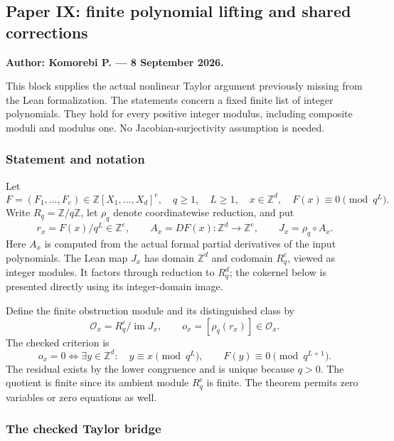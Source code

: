 \hypertarget{cont1:paper-ix-finite-polynomial-lifting-and-shared-corrections}{%
\subsection{Paper IX: finite polynomial lifting and shared
corrections}\label{cont1:paper-ix-finite-polynomial-lifting-and-shared-corrections}}

\textbf{Author: Komorebi P. --- 8 September 2026.}

This block supplies the actual nonlinear Taylor argument previously
missing from the Lean formalization. The statements concern a fixed
finite list of integer polynomials. They hold for every positive integer
modulus, including composite moduli and modulus one. No
Jacobian-surjectivity assumption is needed.

\hypertarget{cont1:statement-and-notation}{%
\subsubsection{Statement and notation}\label{cont1:statement-and-notation}}

Let \[
F=(F_1,\ldots,F_e)\in\mathbb Z[X_1,\ldots,X_d]^e,
\quad q\ge1,\quad L\ge1,
\quad x\in\mathbb Z^d,
\quad F(x)\equiv0\pmod{q^L}.
\] Write \(R_q=\mathbb Z/q\mathbb Z\), let \(\rho_q\) denote
coordinatewise reduction, and put \[
r_x=F(x)/q^L\in\mathbb Z^e,
\qquad A_x=DF(x):\mathbb Z^d\longrightarrow\mathbb Z^e,
\qquad J_x=\rho_q\circ A_x.
\] Here \(A_x\) is computed from the actual formal partial derivatives
of the input polynomials. The Lean map \(J_x\) has domain
\(\mathbb Z^d\) and codomain \(R_q^e\), viewed as integer modules. It
factors through reduction to \(R_q^d\); the cokernel below is presented
directly using its integer-domain image.

Define the finite obstruction module and its distinguished class by \[
\mathcal O_x=R_q^e/\operatorname{im}J_x,
\qquad o_x=[\rho_q(r_x)]\in\mathcal O_x.
\] The checked criterion is \[
\boxed{
 o_x=0
 \iff
 \exists y\in\mathbb Z^d:\quad
 y\equiv x\pmod{q^L},\qquad F(y)\equiv0\pmod{q^{L+1}}.
}
\] The residual exists by the lower congruence and is unique because
\(q>0\). The quotient is finite since its ambient module \(R_q^e\) is
finite. The theorem permits zero variables or zero equations as well.

\hypertarget{cont1:the-checked-taylor-bridge}{%
\subsubsection{The checked Taylor
bridge}\label{cont1:the-checked-taylor-bridge}}

